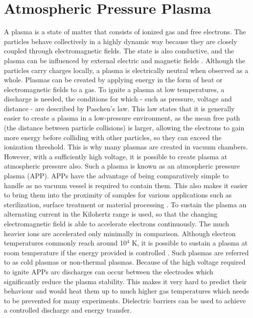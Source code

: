 \section{Atmospheric Pressure Plasma}
A plasma is a state of matter that consists of ionized gas and free electrons. The particles behave collectively in a highly dynamic way because they are closely coupled  through electromagnetic fields. The state is also conductive, and the plasma can be influenced by external electric and magnetic fields \cite{plasma}. Although the particles carry charges locally, a plasma is electrically neutral when observed as a whole. Plasmas can be created by applying energy in the form of heat or electromagnetic fields to a gas. To ignite a plasma at low temperatures, a discharge is needed, the conditions for which - such as pressure, voltage and distance - are described by Paschen's law. This law states that it is generally easier to create a plasma in a low-pressure environment, as the mean free path (the distance between particle collisions) is larger, allowing the electrons to gain more energy before colliding with other particles, so they can exceed the ionization threshold. This is why many plasmas are created in vacuum chambers. However, with a sufficiently high voltage, it is  possible to create plasma at atmospheric pressure also. Such a plasma is known as an atmospheric pressure plasma (APP). APPs have the advantage of being comparatively simple to handle as no vacuum vessel is required to contain them. This also makes it easier to bring them into the proximity of samples for various applications such as sterilization, surface treatment or material processing \cite{plasma}. To sustain the plasma an alternating current in the Kilohertz range is used, so that the changing electromagnetic field is able to accelerate electrons continuously. The much heavier ions are accelerated only minimally in comparison. Although electron temperatures commonly reach around 10$^4$ K, it is possible to sustain a plasma at room temperature if the energy provided is controlled \cite{plasma2}. Such plasmas are referred to as cold plasmas or non-thermal plasmas. Because of the high voltage required to ignite APPs arc discharges can occur between the electrodes which significantly reduce the plasma stability. This makes it very hard to predict their behaviour and would heat them up to much higher gas temperatures which needs to be prevented for many experiments. Dielectric barriers can be used to achieve a controlled discharge and energy transfer. 


